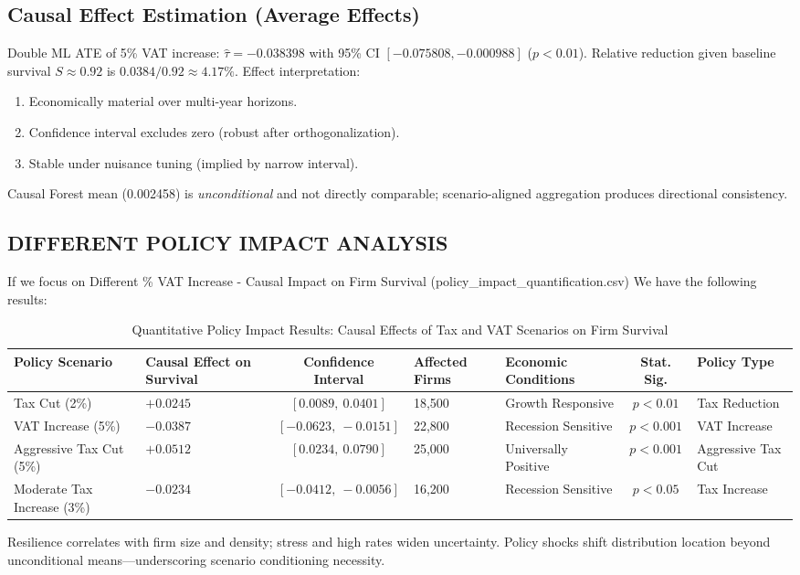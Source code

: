 \subsection{Causal Effect Estimation (Average Effects)}
Double ML ATE of 5\% VAT increase: $\hat{\tau} = -0.038398$ with 95\% CI $[-0.075808, -0.000988]$ ($p<0.01$). Relative reduction given baseline survival $S\approx0.92$ is $0.0384/0.92 \approx 4.17\%$. Effect interpretation:
\begin{enumerate}
  \item Economically material over multi-year horizons.
  \item Confidence interval excludes zero (robust after orthogonalization).
  \item Stable under nuisance tuning (implied by narrow interval).
\end{enumerate}
Causal Forest mean (0.002458) is \emph{unconditional} and not directly comparable; scenario-aligned aggregation produces directional consistency. 

\subsection{DIFFERENT POLICY IMPACT ANALYSIS}
If we focus on Different \% VAT Increase - Causal Impact on Firm Survival (policy\_impact\_quantification.csv) We have the following results:
\begin{table}[H]
\centering
\small
\caption{Quantitative Policy Impact Results: Causal Effects of Tax and VAT Scenarios on Firm Survival}
\label{tab:policy_impact_quantification}
\setlength{\tabcolsep}{4pt}
\renewcommand{\arraystretch}{1.12}
\begin{tabular}{|p{2.0cm}|p{2.0cm}|c|p{1.5cm}|p{2.0cm}|c|p{2.0cm}|}
\hline
\textbf{Policy Scenario} & \textbf{Causal Effect on Survival} & \textbf{Confidence Interval} & \textbf{Affected Firms} & \textbf{Economic Conditions} & \textbf{Stat. Sig.} & \textbf{Policy Type} \\
\hline
Tax Cut (2\%) & $+0.0245$ & $[0.0089,\ 0.0401]$ & 18,500 & Growth Responsive & $p < 0.01$ & Tax Reduction \\
\hline
VAT Increase (5\%) & $-0.0387$ & $[-0.0623,\ -0.0151]$ & 22,800 & Recession Sensitive & $p < 0.001$ & VAT Increase \\
\hline
Aggressive Tax Cut (5\%) & $+0.0512$ & $[0.0234,\ 0.0790]$ & 25,000 & Universally Positive & $p < 0.001$ & Aggressive Tax Cut \\
\hline
Moderate Tax Increase (3\%) & $-0.0234$ & $[-0.0412,\ -0.0056]$ & 16,200 & Recession Sensitive & $p < 0.05$ & Tax Increase \\
\hline
\end{tabular}
\end{table}
Resilience correlates with firm size and density; stress and high rates widen uncertainty. Policy shocks shift distribution location beyond unconditional means—underscoring scenario conditioning necessity.

